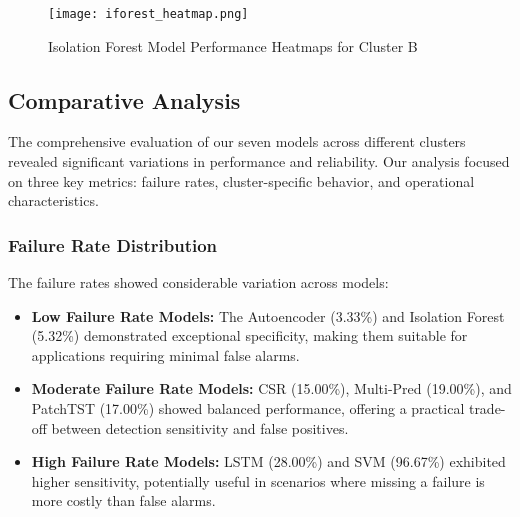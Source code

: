 \documentclass{article}
\begin{document}
\begin{figure}[!htb]
\centering
\texttt{[image: iforest\_heatmap.png]}
\caption{Isolation Forest Model Performance Heatmaps for Cluster B}
\label{fig:iforest-heatmap}
\end{figure}

\subsection{Comparative Analysis}

The comprehensive evaluation of our seven models across different clusters revealed significant variations in performance and reliability. Our analysis focused on three key metrics: failure rates, cluster-specific behavior, and operational characteristics.

\subsubsection{Failure Rate Distribution}
The failure rates showed considerable variation across models:
\begin{itemize}
    \item \textbf{Low Failure Rate Models:} The Autoencoder (3.33\%) and Isolation Forest (5.32\%) demonstrated exceptional specificity, making them suitable for applications requiring minimal false alarms.
    \item \textbf{Moderate Failure Rate Models:} CSR (15.00\%), Multi-Pred (19.00\%), and PatchTST (17.00\%) showed balanced performance, offering a practical trade-off between detection sensitivity and false positives.
    \item \textbf{High Failure Rate Models:} LSTM (28.00\%) and SVM (96.67\%) exhibited higher sensitivity, potentially useful in scenarios where missing a failure is more costly than false alarms.
\end{itemize}
\end{document}
